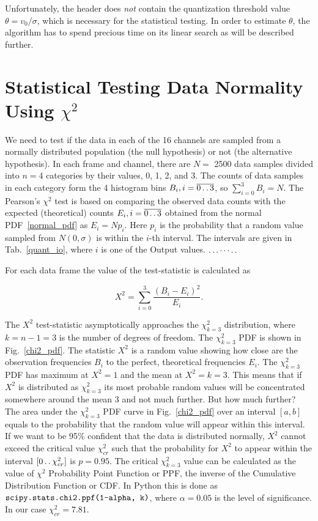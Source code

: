 \documentclass[letterpaper,twoside,12pt]{article}
\newcommand{\twodots}{\mathinner {\ldotp \ldotp}}
\begin{document}
Unfortunately, the header does \emph{not} contain the quantization threshold value $\theta = v_0/\sigma$, which is necessary for the statistical testing. In order to estimate $\theta$, the algorithm has to spend precious time on its linear search as will be described further. 




\section{Statistical Testing Data Normality Using $\chi^2$}

We need to test if the data in each of the 16 channels are sampled from a normally distributed population (the null hypothesis) or not (the alternative hypothesis). In each frame and channel, there are $N=$ 2500 data samples divided into $n=4$ categories by their values, 0, 1, 2, and 3. The counts of data samples in each category form the 4 histogram bins $B_i, i=\overline{0 \twodots 3}$, so $\sum_{i=0}^3 B_i = N$. The Pearson's $\chi^2$ test is based on comparing the observed data counts with the expected (theoretical) counts $E_i, i=\overline{0 \twodots 3}$ obtained from the normal PDF~\eqref{normal_pdf} as $E_i = Np_i$. Here $p_i$ is the probability that a random value sampled from $N(0,\sigma)$ is within the $i$-th interval. The intervals are given in Tab.~\ref{quant_io}, where $i$ is one of the Output values. $\ldots\cdots\ldotp\ldotp$

For each data frame the value of the test-statistic is calculated as

\begin{equation}
  \label{x2_calc}
  X^2 = \sum_{i=0}^3 \frac{(B_i - E_i)^2}{E_i}.
\end{equation}


The $X^2$ test-statistic asymptotically approaches the $\chi^2_{k=3}$ distribution, where $k = n - 1 = 3$ is the number of degrees of freedom. The $\chi^2_{k=3}$ PDF is shown in Fig.~\ref{chi2_pdf}. The statistic $X^2$ is a random value showing how close are the observation frequencies $B_i$ to the perfect, theoretical frequencies $E_i$. The $\chi^2_{k=3}$ PDF has maximum at $X^2=1$ and the mean at $X^2=k=3$. This means that if $X^2$ is distributed as $\chi^2_{k=3}$ its most probable random values will be concentrated somewhere around the mean 3 and not much further. But how much further? The area under the $\chi^2_{k=3}$ PDF curve in Fig.~\ref{chi2_pdf} over an interval $[a,b]$ equals to the probability that the random value will appear within this interval. If we want to be 95\% confident that the data is distributed normally, $X^2$ cannot exceed the critical value $\chi^2_{cr}$ such that the probability for $X^2$ to appear within the interval $[0 \twodots \chi^2_{cr}]$ is $p=0.95$. The critical $\chi^2_{k=3}$ value can be calculated as the value of $\chi^2$ Probability Point Function or PPF, the inverse of the Cumulative Distribution Function or CDF. In Python this is done as $\verb@scipy.stats.chi2.ppf(1-alpha, k)@$, where $\alpha = 0.05$ is the level of significance. In our case $\chi^2_{cr} = 7.81$. 
\end{document}

